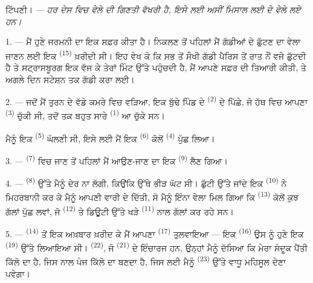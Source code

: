 
\VUsaut{4.0mm}
\VUsaut{2.4mm}
\VUsaut{3.4mm}
\textsc{ਟਿੱਪਣੀ।} --- \textit{ਹਰ ਦੇਸ ਵਿਚ ਵੇਲੇ ਦੀ ਗਿਣਤੀ ਵੱਖਰੀ ਹੈ, ਇਸੇ ਲਈ ਅਸੀਂ ਮਿਸਾਲ
ਲਈ}  \textit{ਦੇ ਵੇਲੇ ਲਏ ਹਨ।}

1. --- ਮੈਂ ਹੁਣੇ ਜਰਮਨੀ ਦਾ ਇਕ ਸਫ਼ਰ ਕੀਤਾ ਹੈ। ਨਿਕਲਣ ਤੋਂ ਪਹਿਲਾਂ ਮੈਂ ਗੱਡੀਆਂ ਦੇ ਛੁੱਟਣ
ਦਾ ਵੇਲਾ ਜਾਣਨ ਲਈ ਇਕ  \textsuperscript{(15)} ਖ਼ਰੀਦੀ ਸੀ। ਇਹ ਵੇਖ
ਕੇ ਕਿ ਸਭ ਤੋਂ ਸੌਖੀ ਗੱਡੀ ਪੈਰਿਸ ਤੋਂ ਰਾਤ ਨੌਂ ਵਜੇ ਛੁੱਟਦੀ ਹੈ ਤੇ ਸਟ੍ਰਾਸਬੂਰਗ ਇਕ ਵੱਜ ਕੇ
ਤੇਰਾਂ ਮਿੰਟ ਉੱਤੇ ਪਹੁੰਚਦੀ ਹੈ, ਮੈਂ ਆਪਣੇ ਸਫ਼ਰ ਦੀ ਤਿਆਰੀ ਕੀਤੀ, ਤੇ ਅਗਲੇ ਦਿਨ ਸਟੇਸ਼ਨ ਤਕ
ਗੱਡੀ ਕਰਾ ਲਈ।

2. --- ਜਦੋਂ ਮੈਂ ਤੁਰਨ ਦੇ ਵੱਡੇ ਕਮਰੇ ਵਿਚ ਵੜਿਆ, ਇਕ ਬੁੱਢੇ ਪਿੰਡ ਦੇ 
\textsuperscript{(2)} ਦੇ ਪਿੱਛੇ, ਜੋ ਹੱਥ ਵਿਚ ਆਪਣਾ 
\textsuperscript{(3)} ਚੁੱਕੀ ਸੀ, ਤਦੋਂ ਤਕ ਬਹੁਤ ਸਾਰੇ 
\textsuperscript{(1)} ਆ ਚੁੱਕੇ ਸਨ।

ਮੈਨੂੰ ਇਕ  \textsuperscript{(5)} ਘੱਲਣੀ ਸੀ, ਇਸੇ ਲਈ ਮੈਂ ਇਕ
 \textsuperscript{(6)} ਕੋਲੋਂ  \textsuperscript{(4)}
ਪੁੱਛ ਲਿਆ।

3. ---  \textsuperscript{(7)} ਵਿਚ ਜਾਣ ਤੋਂ ਪਹਿਲਾਂ ਮੈਂ ਆਉਣ-ਜਾਣ ਦਾ
ਇਕ  \textsuperscript{(9)} ਲੈਣ ਗਿਆ।

4. ---  \textsuperscript{(8)} ਉੱਤੇ ਮੈਨੂੰ ਦੇਰ ਨਾ ਲੱਗੀ, ਕਿਉਂਕਿ
ਉੱਥੇ ਭੀੜ ਘੱਟ ਸੀ। ਛੁੱਟੀ ਉੱਤੇ ਜਾਂਦੇ ਇਕ  \textsuperscript{(10)} ਨੇ
ਮਿਹਰਬਾਨੀ ਕਰ ਕੇ ਮੈਨੂੰ ਆਪਣੀ ਵਾਰੀ ਦੇ ਦਿੱਤੀ, ਸੋ ਮੈਨੂੰ ਇੰਨਾ ਵੇਲਾ ਮਿਲ ਗਿਆ ਕਿ
 \textsuperscript{(13)} ਕੋਲੋਂ ਕੁਝ ਗੱਲਾਂ ਪੁੱਛ ਲਵਾਂ, ਜੋ
 \textsuperscript{(12)} ਤੇ ਡਿਊਟੀ ਉੱਤੇ ਖੜੇ 
\textsuperscript{(11)} ਨਾਲ ਗੱਲਾਂ ਕਰ ਰਹੇ ਸਨ।

\VUsaut{3.0mm}

5. ---  \textsuperscript{(14)} ਤੋਂ ਇਕ ਅਖ਼ਬਾਰ ਖ਼ਰੀਦ ਕੇ ਮੈਂ
ਆਪਣਾ  \textsuperscript{(17)} ਤੁਲਵਾਇਆ — ਇਕ 
\textsuperscript{(16)} ਉਸ ਨੂੰ ਹੁਣੇ ਇਕ 
\textsuperscript{(19)} ਉੱਤੇ ਲਿਆਇਆ ਸੀ।  \textsuperscript{(22)}, ਜੋ
 \textsuperscript{(21)} ਦੇ ਇੰਚਾਰਜ ਹਨ, ਉਨ੍ਹਾਂ ਮੈਨੂੰ ਦੱਸਿਆ ਕਿ ਮੇਰਾ
ਸੰਦੂਕ ਪੈਂਤੀ ਕਿੱਲੋ ਦਾ ਹੈ, ਜਿਸ ਨਾਲ ਪੰਜ ਕਿੱਲੋ ਦਾ  ਬਣਦਾ ਹੈ, ਜਿਸ ਲਈ
ਮੈਨੂੰ  \textsuperscript{(23)} ਉੱਤੇ ਵਾਧੂ ਮਹਿਸੂਲ ਦੇਣਾ ਪਵੇਗਾ।

